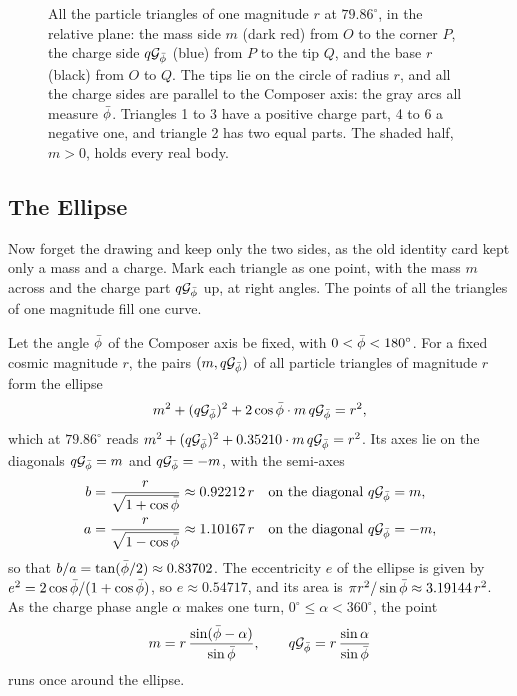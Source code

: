 \begin{figure}[tb]
\myfloatalign

\caption[The circle of the tips]{All the particle triangles of one magnitude $r$ at $79.86^\circ$, in the relative plane: the mass side $m$ (dark red) from $O$ to the corner $P$, the charge side $q\mathcal{G}_{\bar{\phi}}$ (blue) from $P$ to the tip $Q$, and the base $r$ (black) from $O$ to $Q$. The tips lie on the circle of radius $r$, and all the charge sides are parallel to the Composer axis: the gray arcs all measure $\bar{\phi}$. Triangles 1 to 3 have a positive charge part, 4 to 6 a negative one, and triangle 2 has two equal parts. The shaded half, $m > 0$, holds every real body.}
\label{fig:sm-tips}
\end{figure}

\subsection{The Ellipse}\label{subsec:sm-the-ellipse}

Now forget the drawing and keep only the two sides, as the old identity card kept only a mass and a charge. Mark each triangle as one point, with the mass $m$ across and the charge part $q\mathcal{G}_{\bar{\phi}}$ up, at right angles. The points of all the triangles of one magnitude fill one curve.

\begin{corollary}\label{thm:cm-ellipse}
Let the angle $\bar{\phi}$ of the Composer axis be fixed, with $0 < \bar{\phi} < 180^\circ$. For a fixed cosmic magnitude $r$, the pairs $(m, q\mathcal{G}_{\bar{\phi}})$ of all particle triangles of magnitude $r$ form the ellipse
\[
m^2 + (q\mathcal{G}_{\bar{\phi}})^2 + 2\cos\bar{\phi} \cdot m\,q\mathcal{G}_{\bar{\phi}} = r^2,
\]
which at $79.86^\circ$ reads $m^2 + (q\mathcal{G}_{\bar{\phi}})^2 + 0.35210 \cdot m\,q\mathcal{G}_{\bar{\phi}} = r^2$. Its axes lie on the diagonals $q\mathcal{G}_{\bar{\phi}} = m$ and $q\mathcal{G}_{\bar{\phi}} = -m$, with the semi-axes
\begin{align*}
b &= \frac{r}{\sqrt{1 + \cos\bar{\phi}}} \approx 0.92212\,r \quad \text{on the diagonal } q\mathcal{G}_{\bar{\phi}} = m, \\
a &= \frac{r}{\sqrt{1 - \cos\bar{\phi}}} \approx 1.10167\,r \quad \text{on the diagonal } q\mathcal{G}_{\bar{\phi}} = -m,
\end{align*}
so that $b/a = \tan(\bar{\phi}/2) \approx 0.83702$. The eccentricity $e$ of the ellipse is given by $e^2 = 2\cos\bar{\phi}/(1 + \cos\bar{\phi})$, so $e \approx 0.54717$, and its area is $\pi r^2/\sin\bar{\phi} \approx 3.19144\,r^2$. As the charge phase angle $\alpha$ makes one turn, $0^\circ \le \alpha < 360^\circ$, the point
\[
m = r\,\frac{\sin(\bar{\phi} - \alpha)}{\sin\bar{\phi}}, \qquad q\mathcal{G}_{\bar{\phi}} = r\,\frac{\sin\alpha}{\sin\bar{\phi}}
\]
runs once around the ellipse.
\end{corollary}

